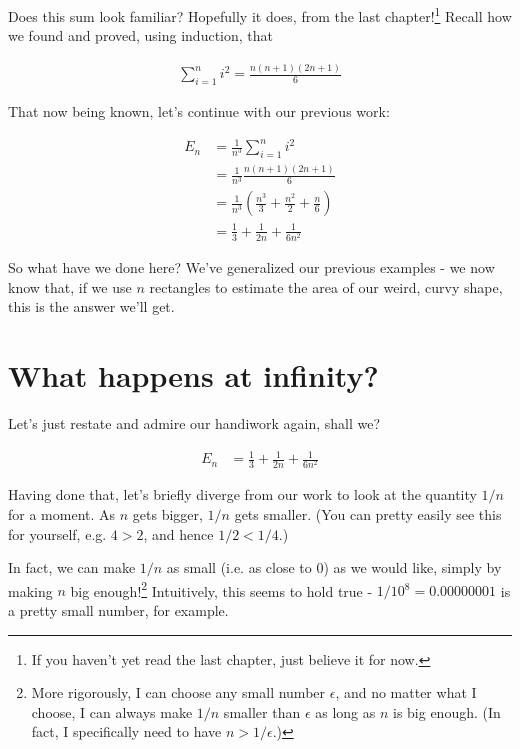 \documentclass{article}
\begin{document}
Does this sum look familiar? Hopefully it does, from the last chapter!\footnote{If you haven't yet read the last chapter, just believe it for now.} Recall how we found and proved, using induction, that 

\begin{align*}
\sum_{i=1}^n i^2 = \frac{n(n+1)(2n+1)}{6}
\end{align*}

That now being known, let's continue with our previous work:


\begin{align*}
E_n &= \frac{1}{n^3} \sum_{i=1}^n i^2 \\
&= \frac{1}{n^3} \frac{n(n+1)(2n+1)}{6} \\
&= \frac{1}{n^3} \left( \frac{n^3}{3} + \frac{n^2}{2} + \frac{n}{6} \right) \\
&= \frac{1}{3} + \frac{1}{2n} + \frac{1}{6n^2}
\end{align*}

So what have we done here? We've generalized our previous examples - we now know that, if we use $n$ rectangles to estimate the area of our weird, curvy shape, this is the answer we'll get.



\section{What happens at infinity?}

Let's just restate and admire our handiwork again, shall we?


\begin{align*}
E_n &= \frac{1}{3} + \frac{1}{2n} + \frac{1}{6n^2}
\end{align*}

Having done that, let's briefly diverge from our work to look at the quantity $1/n$ for a moment. As $n$ gets bigger, $1/n$ gets smaller. (You can pretty easily see this for yourself, e.g. $4 > 2$, and hence $1/2 < 1/4$.) 

In fact, we can make $1/n$ as small (i.e. as close to 0) as we would like, simply by making $n$ big enough!\footnote{More rigorously, I can choose any small number $\epsilon$, and no matter what I choose, I can always make $1/n$ smaller than $\epsilon$ as long as $n$ is big enough. (In fact, I specifically need to have $n > 1/\epsilon$.)} Intuitively, this seems to hold true - $1/10^8 = 0.00000001$ is a pretty small number, for example.
\end{document}
